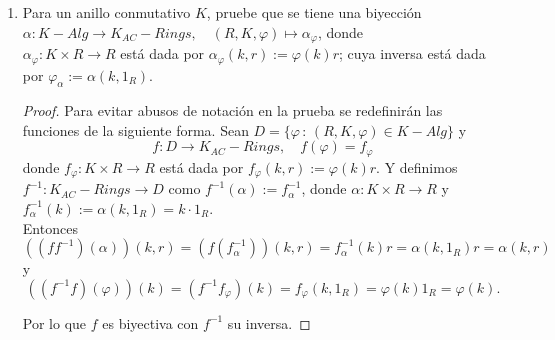 \documentclass{article}
\newcommand{\lrprth}[1]{
    \left(#1\right)
}
\newcommand{\ringcenter}[1]{
    C\lrprth{#1}
}
\theoremstyle{definition}
\theoremstyle{plain}
\theoremstyle{plain}
\theoremstyle{definition}
\theoremstyle{definition}
\theoremstyle{definition}
\theoremstyle{definition}
\theoremstyle{definition}
\theoremstyle{definition}
\begin{document}
\begin{enumerate}[label=\textbf{Ej \arabic*.}]
\begin{proof}
Finalmente, de la quinta condición de ser acción a izquierda, se deduce que $im\lrprth{\varphi_{\alpha}}\subseteq\ringcenter{R}$. En efecto, si $k \in K$ y $r \in R$, entonces
\begin{align*}
\varphi_{\alpha}\lrprth{k}r=\lrprth{k \cdot 1_{R}}r\\
=k \cdot\lrprth{1_{R}r}\\
=k \cdot\lrprth{r1_{R}}\\
=r \cdot\lrprth{k1_{R}}\\
=r\varphi_{\alpha}\lrprth{k}
\end{align*}
Por lo que $im\lrprth{\varphi_{\alpha}}\subseteq \ringcenter{R}$.
\end{proof}
    \item 
Para un anillo conmutativo $K$, pruebe que se tiene una biyección \\
$\alpha:K-Alg\longrightarrow K_{AC}-Rings,\quad  (R,K,\varphi)\longmapsto \alpha_{\varphi}$, donde \\
$\alpha_\varphi:K\times R\to R$ está dada por $\alpha_\varphi(k,r):=\varphi(k)r$; cuya inversa está dada por
 $\varphi_\alpha:=\alpha(k,1_R).$
 
 \begin{proof}
Para evitar abusos de notación en la prueba se redefinirán las funciones de la siguiente forma. Sean 
$D=\{\varphi \,:\, (R,K,\varphi)\in  K-Alg\}$ y 
\[f:D\longrightarrow K_{AC}-Rings, \quad f(\varphi)=f_\varphi\]
donde $f_\varphi:K\times R\to R$ está dada por $f_\varphi(k,r):=\varphi(k)r$. Y definimos \\
$f^{-1}:K_{AC}-Rings\longrightarrow D$ como $f^{-1}(\alpha):=f^{-1}_\alpha$, donde
 $\alpha:K\times R\to R$ y $f^{-1}_\alpha(k):=\alpha (k,1_R)=k\cdot 1_R$.\\
 
Entonces \[\left((ff^{-1})(\alpha)\right)(k,r)=\left(f(f^{-1}_\alpha)\right)(k,r)=f^{-1}_\alpha(k)r=\alpha(k,1_R)r=\alpha(k,r)\]
y
\[\left((f^{-1}f)(\varphi)\right)(k)=\left(f^{-1}f_\varphi\right)(k)=f_\varphi(k,1_R)=\varphi(k)1_R=\varphi(k).\]

Por lo que $f$ es biyectiva con $f^{-1}$ su inversa.
\end{proof}


\end{enumerate}
\end{document}
